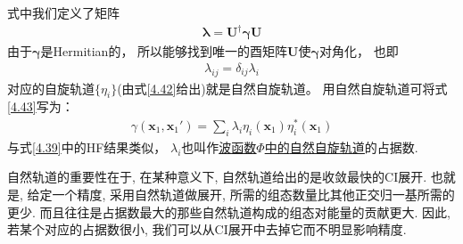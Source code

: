 式中我们定义了矩阵
\begin{align}
\bm{\lambda} = \mathbf{U^\dagger}\bm{\gamma}\mathbf{U}
\end{align}
由于$\bm{\gamma}$是Hermitian的，
所以能够找到唯一的酉矩阵$\mathbf{U}$使$\bm{\gamma}$对角化，
也即
\begin{align}
\lambda_{ij} = \delta_{ij}\lambda_i
\end{align}
对应的自旋轨道$\{\eta_i\}$(由式\eqref{4.42}给出)就是自然自旋轨道。
用自然自旋轨道可将式\eqref{4.43}写为：
\begin{align}
\gamma(\mathbf{x}_1,\mathbf{x}_1') = \sum_i \lambda_i \eta_i(\mathbf{x}_1) \eta_i^*(\mathbf{x}_1)
\end{align}
与式\eqref{4.39}中的HF结果类似，
$\lambda_i$也叫作\underline{\underline{波函数$\Phi$}中的\underline{自然自旋轨道}}的占据数.


自然轨道的重要性在于, 
在某种意义下, 
自然轨道给出的是收敛最快的CI展开. 
也就是, 
给定一个精度, 
采用自然轨道做展开, 
所需的组态数量比其他正交归一基所需的更少. 
而且往往是占据数最大的那些自然轨道构成的组态对能量的贡献更大. 
因此, 
若某个对应的占据数很小, 
我们可以从CI展开中去掉它而不明显影响精度.


